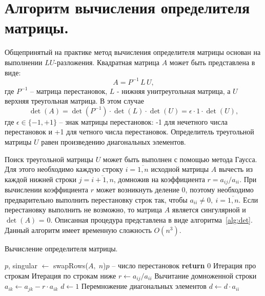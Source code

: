 \documentclass[a4paper,14pt]{extarticle}
\begin{document}
    \newpage
    \section{Алгоритм вычисления определителя матрицы.}

    Общепринятый на практике метод вычисления определителя матрицы основан на выполнении $LU$-разложения.
    Квадратная матрица $A$ может быть представлена в виде:
    \begin{equation*}
        A = P^{-1} \, L \, U,
    \end{equation*}
    где $P^{-1}$ -- матрица перестановок, $L$ -  нижняя унитреугольная матрица, а $U$ верхняя треугольная матрица.
    В этом случае
    \begin{equation*}
        \det(A) = \det(P^{-1}) \cdot \det(L) \cdot \det(U) = \epsilon \cdot 1 \cdot \det(U),
    \end{equation*}
    где $\epsilon \in \{-1, +1\}$ -- знак матрицы перестановок:
    -1 для нечетного числа перестановок и +1 для четного числа перестановок.
    Определитель треугольной матрицы $U$ равен произведению диагональных элементов.

    Поиск треугольной матрицы $U$ может быть выполнен с помощью метода Гаусса.
    Для этого необходимо каждую строку $i = \overline{1, n}$ исходной матрицы $A$ вычесть из каждой нижней строки
    $j = \overline{i+1, n}$, домножив на коэффициента $r = a_{ij}/a_{ii}$.
    При вычислении коэффициента $r$ может возникнуть деление 0,
    поэтому необходимо предварительно выполнить перестановку строк так, чтобы $a_{ii} \neq 0, \: i = \overline{1, n}$.
    Если перестановку выполнить не возможно, то матрица $A$ является сингулярной и $\det(A)$ = 0.
    Описанная процедура представлена в виде алгоритма~\ref{alg:det}.
    Данный алгоритм имеет временную сложность $O(n^3)$.

    \begin{algorithm}[h]
        \caption{Вычисление определителя матрицы.}
        \label{alg:det}
        \begin{algorithmic}[1]
            \State $p$, singular $\gets$ swapRows($A, \; n$)\Comment $p$ -- число перестановок
            \State \textbf{return} $0$
            \EndIf
             \Comment Итерация про строкам
             \Comment Итерация по строкам ниже
            \State $r \gets a_{ij} / a_{ii}$
             \Comment Вычитание домноженной строки
            \State $a_{ik} \gets a_{jk} - r \cdot a_{ik} $
            \EndFor
            \EndFor
            \EndFor
            \State $d \gets 1$
            \Comment Перемножение диагональных элементов
            \State $d \gets d \cdot a_{ii}$
            \EndFor
        \end{algorithmic}
    \end{algorithm}
\end{document}
